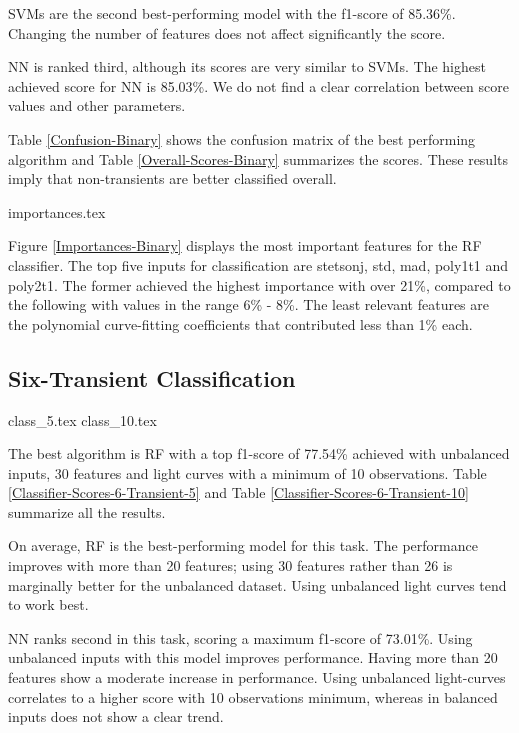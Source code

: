 \documentclass[a4paper,fleqn,usenatbib]{mnras}
\begin{document}
SVMs are the second best-performing model with the f1-score of 85.36\%. 
Changing the number of features does not affect significantly the score.

NN is ranked third, although its scores are very similar to SVMs. 
The highest achieved score for NN is 85.03\%.
We do not find a clear correlation between score values and other
parameters.  

Table \ref{Confusion-Binary} shows the confusion matrix of the best
performing algorithm and Table \ref{Overall-Scores-Binary} summarizes
the scores.
These results imply that non-transients are better classified overall.  


{importances.tex}

Figure \ref{Importances-Binary} displays the most important features
for the RF classifier.
The top five inputs for classification are stetson\textunderscore j,
std, mad, poly1\textunderscore t1 and poly2\textunderscore t1.  
The former achieved the highest importance with over 21\%, compared to
the following with values in the range 6\% - 8\%. 
The least relevant features are the polynomial curve-fitting
coefficients that contributed less than 1\% each.


\subsection{Six-Transient Classification}

{class_5.tex}
{class_10.tex}

The best algorithm is RF with a top f1-score of 77.54\% achieved with 
unbalanced inputs, 30 features and light curves with a minimum of 10
observations. 
Table \ref{Classifier-Scores-6-Transient-5} and Table
\ref{Classifier-Scores-6-Transient-10} summarize all the
results. 
 
On average, RF is the best-performing model for this task. 
The performance improves with more than 20 features; using 30 features 
rather than 26 is marginally better for the unbalanced dataset. 
Using unbalanced light curves tend to work best.

NN ranks second in this task, scoring a maximum f1-score of 73.01\%. 
Using unbalanced inputs with this model improves performance.
Having more than 20 features show a moderate increase in performance. 
Using unbalanced light-curves correlates to a higher score with 10 
observations minimum, whereas in balanced inputs does
not show a clear trend.
\end{document}

